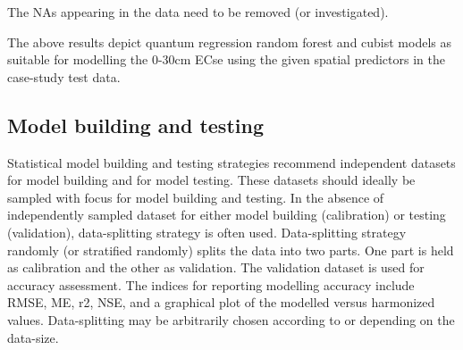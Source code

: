 \documentclass[
  10pt,
  b5paper,
]{book}
\newenvironment{Shaded}{\begin{snugshade}}{\end{snugshade}}
\newcommand{\CommentTok}[1]{\textcolor[rgb]{0.56,0.35,0.01}{\textit{#1}}}
\newcommand{\KeywordTok}[1]{\textcolor[rgb]{0.13,0.29,0.53}{\textbf{#1}}}
\newcommand{\NormalTok}[1]{#1}
\newcommand{\OperatorTok}[1]{\textcolor[rgb]{0.81,0.36,0.00}{\textbf{#1}}}
\newcommand{\StringTok}[1]{\textcolor[rgb]{0.31,0.60,0.02}{#1}}
\begin{document}
The NAs appearing in the data need to be removed (or investigated).

\begin{Shaded}
\end{Shaded}

The above results depict quantum regression random forest and cubist models as suitable for modelling the 0-30cm ECse using the given spatial predictors in the case-study test data.

\hypertarget{model-building-and-testing}{%
\subsection{Model building and testing}\label{model-building-and-testing}}

Statistical model building and testing strategies recommend independent datasets for model building and for model testing. These datasets should ideally be sampled with focus for model building and testing. In the absence of independently sampled dataset for either model building (calibration) or testing (validation), data-splitting strategy is often used. Data-splitting strategy randomly (or stratified randomly) splits the data into two parts. One part is held as calibration and the other as validation. The validation dataset is used for accuracy assessment. The indices for reporting modelling accuracy include RMSE, ME, r2, NSE, and a graphical plot of the modelled versus harmonized values. Data-splitting may be arbitrarily chosen according to or depending on the data-size.
\end{document}
